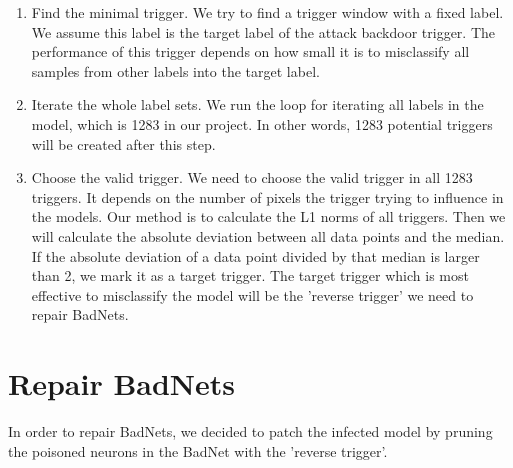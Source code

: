 \documentclass{article}
\begin{document}
\begin{enumerate}
    \item Find the minimal trigger. We try to find a trigger window with a fixed label. We assume this label is the target label of the attack backdoor trigger. The performance of this trigger depends on how small it is to misclassify all samples from other labels into the target label.
    
    \item Iterate the whole label sets. We run the loop for iterating all labels in the model, which is 1283 in our project. In other words, 1283 potential triggers will be created after this step.
    
    \item Choose the valid trigger. We need to choose the valid trigger in all 1283 triggers. It depends on the number of pixels the trigger trying to influence in the models. Our method is to calculate the L1 norms of all triggers. Then we will calculate the absolute deviation between all data points and the median. If the absolute deviation of a data point divided by that median is larger than 2, we mark it as a target trigger. The target trigger which is most effective to misclassify the model will be the 'reverse trigger' we need to repair BadNets.
\end{enumerate}


\section{Repair BadNets}
In order to repair BadNets, we decided to patch the infected model by pruning the poisoned neurons in the BadNet with the 'reverse trigger'.


\newpage
\end{document}
